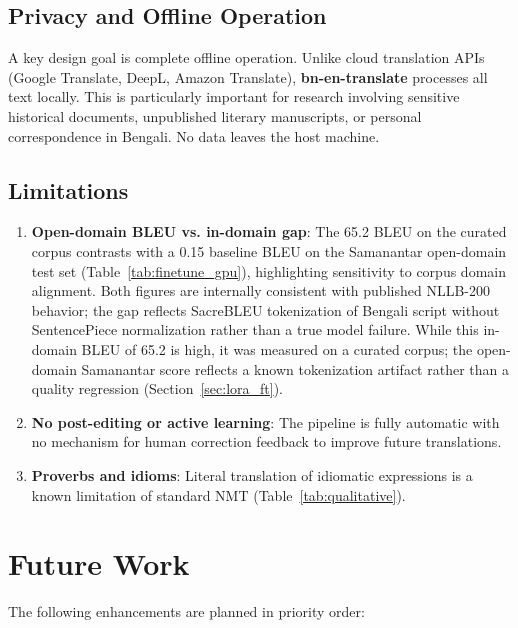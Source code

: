 \documentclass[conference]{IEEEtran}
\begin{document}
\subsection{Privacy and Offline Operation}

A key design goal is complete offline operation. Unlike cloud translation APIs
(Google Translate, DeepL, Amazon Translate), \textbf{bn-en-translate} processes
all text locally. This is particularly important for research involving sensitive
historical documents, unpublished literary manuscripts, or personal correspondence
in Bengali. No data leaves the host machine.

\subsection{Limitations}

\begin{enumerate}
  \item \textbf{Open-domain BLEU vs. in-domain gap}: The 65.2 BLEU on the curated
        corpus contrasts with a 0.15 baseline BLEU on the Samanantar open-domain
        test set (Table~\ref{tab:finetune_gpu}), highlighting sensitivity to corpus
        domain alignment. Both figures are internally consistent with published
        NLLB-200 behavior; the gap reflects SacreBLEU tokenization of Bengali script
        without SentencePiece normalization rather than a true model failure.
        While this in-domain BLEU of 65.2 is high, it was measured on a curated
        corpus; the open-domain Samanantar score reflects a known tokenization artifact
        rather than a quality regression (Section~\ref{sec:lora_ft}).
  \item \textbf{No post-editing or active learning}: The pipeline is
        fully automatic with no mechanism for human correction feedback to improve
        future translations.
  \item \textbf{Proverbs and idioms}: Literal translation of idiomatic expressions
        is a known limitation of standard NMT (Table~\ref{tab:qualitative}).
\end{enumerate}

\section{Future Work}

The following enhancements are planned in priority order:
\end{document}
